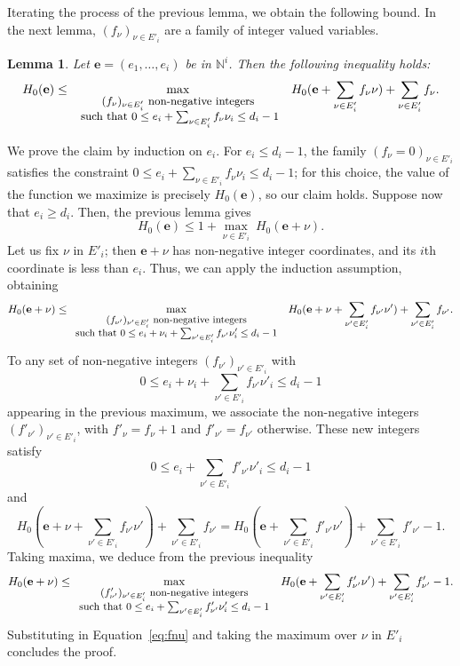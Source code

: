 \documentclass[amsthm]{elsart}
\def\e {\ensuremath{\mathbf{e}}}
\def\N {\ensuremath{\mathbb{N}}}
\theoremstyle{plain}
\newtheorem{Lemma}{Lemma}
\begin{document}
Iterating the process of the previous lemma, we obtain the following
bound. In the next lemma, $(f_\nu)_{\nu \in E'_i}$ are a family of
integer valued variables.
\begin{Lemma}\label{lemma:3}
  Let $\e=(e_1,\dots,e_i)$ be in $\N^i$. Then the following inequality holds:
$$H_0(\e) \le \max_{\small
\begin{array}{c}
(f_\nu)_{\nu \in E'_i} \text{~non-negative integers}\\
\text{ such~that~}  0 \le e_i + \sum_{\nu \in E'_i} f_\nu \nu_i \le d_i-1
\end{array}
}\ 
 H_0(\e + \sum_{\nu \in E'_i} f_\nu \nu)+ \sum_{\nu \in E'_i} f_\nu.$$
\end{Lemma}
\begin{pf} We prove the claim by induction on $e_i$.  For $e_i \le
  d_i-1$, the family $(f_\nu=0)_{\nu \in E'_i}$ satisfies 
the constraint $0 \le e_i + \sum_{\nu \in E'_i} f_\nu \nu_i \le d_i-1$;
for this choice, the value of the function we maximize is precisely
$H_0(\e)$, so our claim holds.
Suppose now that $e_i \ge d_i$. Then, the previous 
lemma gives
\begin{equation}\label{eq:fnu}H_0(\e) \le 1 + \max_{\nu \in E'_i}\  H_0(\e + \nu).
\end{equation}
Let us fix $\nu$ in $E'_i$; then $\e+\nu$ has non-negative integer
coordinates, and its $i$th coordinate is less than $e_i$.
Thus, we can apply the induction assumption, obtaining
$$H_0(\e+\nu) \le \max_{\small
\begin{array}{c}
(f_{\nu'})_{\nu' \in E'_i} \text{~non-negative integers}\\
\text{such~that~}  0 \le e_i+\nu_i + \sum_{\nu' \in E'_i} f_{\nu'} \nu'_i \le d_i-1
\end{array}
}\ H_0(\e + \nu + \sum_{\nu' \in E'_i} f_{\nu'} \nu')+ \sum_{\nu' \in
  E'_i} f_{\nu'}.$$ To any set of non-negative integers
$(f_{\nu'})_{\nu' \in E'_i}$ with $$0 \le e_i+\nu_i + \sum_{\nu' \in
  E'_i} f_{\nu'} \nu'_i \le d_i-1$$ appearing in the previous maximum, we
associate the non-negative integers $(f'_{\nu'})_{\nu' \in E'_i}$, with
$f'_{\nu}=f_{\nu}+1$ and $f'_{\nu'}=f_{\nu'}$ otherwise. These new
integers satisfy
$$0 \le e_i + \sum_{\nu' \in  E'_i} f'_{\nu'} \nu'_i \le d_i-1$$
and
$$
H_0(\e + \nu + \sum_{\nu' \in E'_i} f_{\nu'} \nu')+ \sum_{\nu' \in
 E'_i} f_{\nu'}=
H_0(\e + \sum_{\nu' \in E'_i} f'_{\nu'} \nu')+ \sum_{\nu' \in
  E'_i} f'_{\nu'}-1.
$$
Taking maxima, we deduce from the previous inequality
$$H_0(\e+\nu) \le  \max_{\small \begin{array}{c}
(f'_{\nu'})_{\nu' \in E'_i} \text{~non-negative integers}\\
\text{such~that~}  0 \le e_i + \sum_{\nu' \in E'_i} f'_{\nu'} \nu'_i \le d_i-1
\end{array}}
\ H_0(\e + \sum_{\nu' \in E'_i} f'_{\nu'} \nu')+ \sum_{\nu' \in
  E'_i} f'_{\nu'}-1.$$
Substituting in Equation~\eqref{eq:fnu} and taking the maximum over
$\nu$ in $E'_i$ concludes the proof.
\end{pf}
\end{document}

